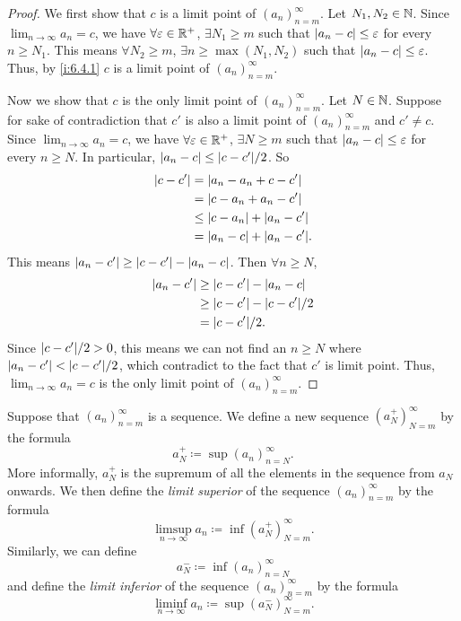 \begin{proof}
  We first show that \(c\) is a limit point of \((a_n)_{n = m}^\infty\).
  Let \(N_1, N_2 \in \mathbb{N}\).
  Since \(\lim_{n \to \infty} a_n = c\), we have \(\forall \varepsilon \in \mathbb{R}^+\), \(\exists N_1 \geq m\) such that \(\left\lvert a_n - c\right\rvert \leq \varepsilon\) for every \(n \geq N_1\).
  This means \(\forall N_2 \geq m\), \(\exists n \geq \max(N_1, N_2)\) such that \(\left\lvert a_n - c\right\rvert \leq \varepsilon\).
  Thus, by \cref{i:6.4.1} \(c\) is a limit point of \((a_n)_{n = m}^\infty\).

  Now we show that \(c\) is the only limit point of \((a_n)_{n = m}^\infty\).
  Let \(N \in \mathbb{N}\).
  Suppose for sake of contradiction that \(c'\) is also a limit point of \((a_n)_{n = m}^\infty\) and \(c' \neq c\).
  Since \(\lim_{n \to \infty} a_n = c\), we have \(\forall \varepsilon \in \mathbb{R}^+\), \(\exists N \geq m\) such that \(\left\lvert a_n - c\right\rvert \leq \varepsilon\) for every \(n \geq N\).
  In particular, \(\abs{a_n - c} \leq \abs{c - c'} / 2\).
  So
  \begin{align*}
    \abs{c - c'} & = \abs{a_n - a_n + c - c'}          \\
                 & = \abs{c - a_n + a_n - c'}          \\
                 & \leq \abs{c - a_n} + \abs{a_n - c'} \\
                 & = \abs{a_n - c} + \abs{a_n - c'}.
  \end{align*}
  This means \(\left\lvert a_n - c'\right\rvert \geq \left\lvert c - c'\right\rvert - \left\lvert a_n - c\right\rvert\).
  Then \(\forall n \geq N\),
  \begin{align*}
    \abs{a_n - c'} & \geq \abs{c - c'} - \abs{a_n - c}    \\
                   & \geq \abs{c - c'} - \abs{c - c'} / 2 \\
                   & = \abs{c - c'} / 2.
  \end{align*}
  Since \(\abs{c - c'} / 2 > 0\), this means we can not find an \(n \geq N\) where \(\abs{a_n - c'} < \abs{c - c'} / 2\), which contradict to the fact that \(c'\) is limit point.
  Thus, \(\lim_{n \to \infty} a_n = c\) is the only limit point of \((a_n)_{n = m}^\infty\).
\end{proof}

\begin{defn}\label{i:6.4.6}
  Suppose that \((a_n)_{n = m}^\infty\) is a sequence.
  We define a new sequence \((a_N^+)_{N = m}^\infty\) by the formula
  \[
    a_N^+ \coloneqq \sup(a_n)_{n = N}^\infty.
  \]
  More informally, \(a_N^+\) is the supremum of all the elements in the sequence from \(a_N\) onwards.
  We then define the \emph{limit superior} of the sequence \((a_n)_{n = m}^\infty\) by the formula
  \[
    \limsup_{n \to \infty} a_n \coloneqq \inf(a_N^+)_{N = m}^\infty.
  \]
  Similarly, we can define
  \[
    a_N^- \coloneqq \inf(a_n)_{n = N}^\infty
  \]
  and define the \emph{limit inferior} of the sequence \((a_n)_{n = m}^\infty\) by the formula
  \[
    \liminf_{n \to \infty} a_n \coloneqq \sup(a_N^-)_{N = m}^\infty.
  \]
\end{defn}

